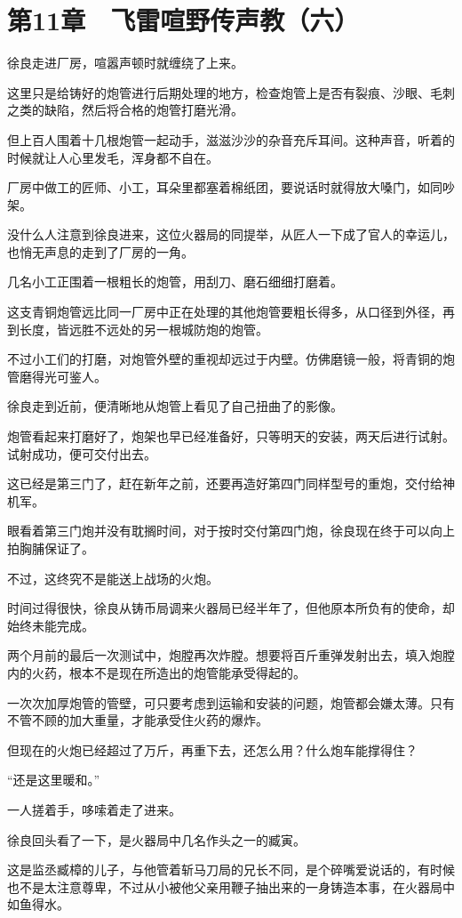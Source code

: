\section{第11章　飞雷喧野传声教（六）}

徐良走进厂房，喧嚣声顿时就缠绕了上来。

这里只是给铸好的炮管进行后期处理的地方，检查炮管上是否有裂痕、沙眼、毛刺之类的缺陷，然后将合格的炮管打磨光滑。

但上百人围着十几根炮管一起动手，滋滋沙沙的杂音充斥耳间。这种声音，听着的时候就让人心里发毛，浑身都不自在。

厂房中做工的匠师、小工，耳朵里都塞着棉纸团，要说话时就得放大嗓门，如同吵架。

没什么人注意到徐良进来，这位火器局的同提举，从匠人一下成了官人的幸运儿，也悄无声息的走到了厂房的一角。

几名小工正围着一根粗长的炮管，用刮刀、磨石细细打磨着。

这支青铜炮管远比同一厂房中正在处理的其他炮管要粗长得多，从口径到外径，再到长度，皆远胜不远处的另一根城防炮的炮管。

不过小工们的打磨，对炮管外壁的重视却远过于内壁。仿佛磨镜一般，将青铜的炮管磨得光可鉴人。

徐良走到近前，便清晰地从炮管上看见了自己扭曲了的影像。

炮管看起来打磨好了，炮架也早已经准备好，只等明天的安装，两天后进行试射。试射成功，便可交付出去。

这已经是第三门了，赶在新年之前，还要再造好第四门同样型号的重炮，交付给神机军。

眼看着第三门炮并没有耽搁时间，对于按时交付第四门炮，徐良现在终于可以向上拍胸脯保证了。

不过，这终究不是能送上战场的火炮。

时间过得很快，徐良从铸币局调来火器局已经半年了，但他原本所负有的使命，却始终未能完成。

两个月前的最后一次测试中，炮膛再次炸膛。想要将百斤重弹发射出去，填入炮膛内的火药，根本不是现在所造出的炮管能承受得起的。

一次次加厚炮管的管壁，可只要考虑到运输和安装的问题，炮管都会嫌太薄。只有不管不顾的加大重量，才能承受住火药的爆炸。

但现在的火炮已经超过了万斤，再重下去，还怎么用？什么炮车能撑得住？

“还是这里暖和。”

一人搓着手，哆嗦着走了进来。

徐良回头看了一下，是火器局中几名作头之一的臧寅。

这是监丞臧樟的儿子，与他管着斩马刀局的兄长不同，是个碎嘴爱说话的，有时候也不是太注意尊卑，不过从小被他父亲用鞭子抽出来的一身铸造本事，在火器局中如鱼得水。

